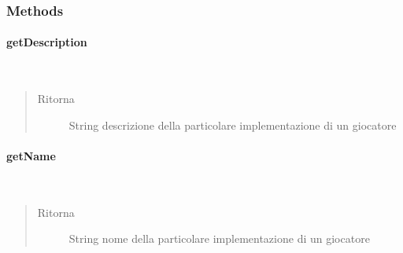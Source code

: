 \documentclass[letterpaper,10pt,italian,openany,oneside]{sphinxmanual}
\begin{document}
\subsubsection{Methods}
\label{\detokenize{source/it/unicam/cs/pa/mastermind/factories/PlayerFactory:methods}}

\paragraph{getDescription}
\label{\detokenize{source/it/unicam/cs/pa/mastermind/factories/PlayerFactory:getdescription}}

\begin{fulllineitems}
\label{\detokenize{source/it/unicam/cs/pa/mastermind/factories/PlayerFactory:it.unicam.cs.pa.mastermind.factories.PlayerFactory.getDescription()}}~\begin{quote}\begin{description}
\item[{Ritorna}] \leavevmode
String descrizione della particolare implementazione di un giocatore

\end{description}\end{quote}

\end{fulllineitems}



\paragraph{getName}
\label{\detokenize{source/it/unicam/cs/pa/mastermind/factories/PlayerFactory:getname}}

\begin{fulllineitems}
\label{\detokenize{source/it/unicam/cs/pa/mastermind/factories/PlayerFactory:it.unicam.cs.pa.mastermind.factories.PlayerFactory.getName()}}~\begin{quote}\begin{description}
\item[{Ritorna}] \leavevmode
String nome della particolare implementazione di un giocatore

\end{description}\end{quote}

\end{fulllineitems}
\end{document}
